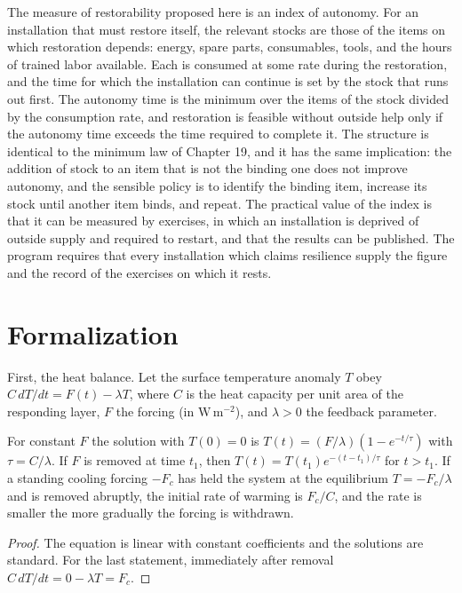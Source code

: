 The measure of restorability proposed here is an index of autonomy. For an installation that must restore itself, the relevant stocks are those of the items on which restoration depends: energy, spare parts, consumables, tools, and the hours of trained labor available. Each is consumed at some rate during the restoration, and the time for which the installation can continue is set by the stock that runs out first. The autonomy time is the minimum over the items of the stock divided by the consumption rate, and restoration is feasible without outside help only if the autonomy time exceeds the time required to complete it. The structure is identical to the minimum law of Chapter 19, and it has the same implication: the addition of stock to an item that is not the binding one does not improve autonomy, and the sensible policy is to identify the binding item, increase its stock until another item binds, and repeat. The practical value of the index is that it can be measured by exercises, in which an installation is deprived of outside supply and required to restart, and that the results can be published. The program requires that every installation which claims resilience supply the figure and the record of the exercises on which it rests.

\section*{Formalization}

First, the heat balance. Let the surface temperature anomaly $T$ obey $C\,dT/dt=F(t)-\lambda T$, where $C$ is the heat capacity per unit area of the responding layer, $F$ the forcing (in $\mathrm{W\,m^{-2}}$), and $\lambda>0$ the feedback parameter.

\begin{proposition}
For constant $F$ the solution with $T(0)=0$ is $T(t)=(F/\lambda)(1-e^{-t/\tau})$ with $\tau=C/\lambda$. If $F$ is removed at time $t_1$, then $T(t)=T(t_1)e^{-(t-t_1)/\tau}$ for $t>t_1$. If a standing cooling forcing $-F_c$ has held the system at the equilibrium $T=-F_c/\lambda$ and is removed abruptly, the initial rate of warming is $F_c/C$, and the rate is smaller the more gradually the forcing is withdrawn.
\end{proposition}

\begin{proof}
The equation is linear with constant coefficients and the solutions are standard. For the last statement, immediately after removal $C\,dT/dt=0-\lambda T=F_c$.
\end{proof}

